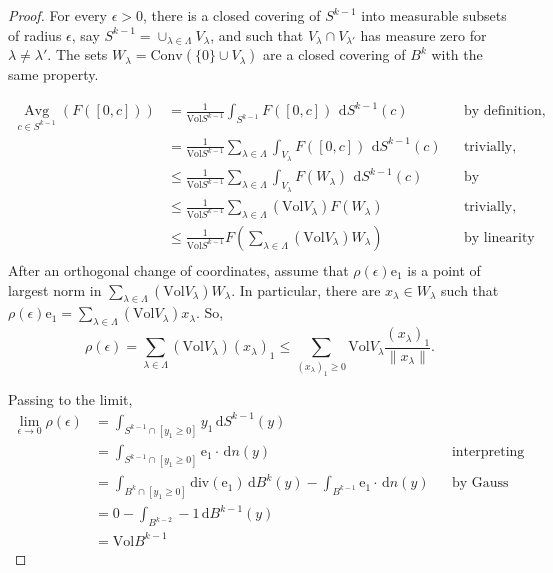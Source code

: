 \documentclass{amsart}
\theoremstyle{definition}
\theoremstyle{remark}
\begin{document}
\begin{proof}
For every $\epsilon > 0$, there is a closed covering of $S^{k-1}$ into measurable subsets of
radius $\epsilon$, say $S^{k-1} = \cup_{\lambda \in \Lambda} V_{\lambda}$, and
such that $V_{\lambda} \cap V_{\lambda'}$ has measure zero for $\lambda \ne \lambda'$.
The sets $W_{\lambda} = {\mathrm{Conv}({\{0\} \cup V_{\lambda}})}$ are a closed covering of
$B^k$ with the same property. 

\begin{align*}
{\operatorname*{Avg}_{{c \in S^{k-1}}}} ( F([0,c])) &= \frac{1}{{\mathrm{Vol}}{S^{k-1}}} \int_{S^{k-1}} F([0,c]) \ {\,\mathrm{d}} S^{k-1}(c) && \text{by definition,}\\
&=\frac{1}{{\mathrm{Vol}}{S^{k-1}}} \sum_{\lambda \in \Lambda} \int_{V_{\lambda}} F([0,c]) \ {\,\mathrm{d}} S^{k-1}(c) && \text{trivially,}\\
&\le\frac{1}{{\mathrm{Vol}}{S^{k-1}}} \sum_{\lambda \in \Lambda} \int_{V_{\lambda}} F(W_{\lambda}) \ {\,\mathrm{d}} S^{k-1}(c) && \text{by monotonicity,}\\
&\le\frac{1}{{\mathrm{Vol}}{S^{k-1}}} \sum_{\lambda \in \Lambda} ({\mathrm{Vol}}{V_{\lambda}}) F(W_{\lambda}) && \text{trivially,}\\
&\le\frac{1}{{\mathrm{Vol}}{S^{k-1}}} F\left(\sum_{\lambda \in \Lambda} ({\mathrm{Vol}}{V_{\lambda}}) W_{\lambda}\right) && \text{by linearity}\\
\end{align*}
After an orthogonal change of coordinates, assume that $\rho(\epsilon) \mathrm e_1$ is a point of largest norm
in $\sum_{\lambda \in \Lambda} ({\mathrm{Vol}}{V_{\lambda}}) W_{\lambda}$. In particular, there are $x_{\lambda} \in W_{\lambda}$
such that $\rho(\epsilon) \mathrm e_1 = \sum_{\lambda \in \Lambda} ({\mathrm{Vol}}{V_{\lambda}}) x_{\lambda}$.
So,
\[
\rho(\epsilon) = \sum_{\lambda \in \Lambda} ({\mathrm{Vol}}{V_{\lambda}}) (x_\lambda)_1 \le  
\sum_{ (x_{\lambda})_1 \ge 0} {\mathrm{Vol}}{V_{\lambda}} \frac{(x_\lambda)_1}{\|x_\lambda\|}.
\]

Passing to the limit,
\begin{align*}
\lim_{\epsilon \rightarrow 0}\rho(\epsilon) &= 
\int_{S^{k-1} \cap [y_1 \ge 0]} y_1 {\,\mathrm{d}} S^{k-1}(y) \\
               &= 
\int_{S^{k-1} \cap [y_1 \ge 0]} \mathrm e_1 \cdot  {\,\mathrm{d}} n(y) && \text{interpreting as a flow,}\\
               &= 
\int_{B^{k} \cap [y_1 \ge 0]} \mathrm{div}(\mathrm e_1)  {\,\mathrm{d}} B^{k}(y) 
-
\int_{B^{k-1}} \mathrm e_1 \cdot  {\,\mathrm{d}} n(y)&&\text{by Gauss theorem,} \\
               &=
0 - \int_{B^{k-2}} -1 {\,\mathrm{d}} B^{k-1}(y) \\
&= {\mathrm{Vol}}{B^{k-1}}
\end{align*}


\end{proof}
\end{document}
